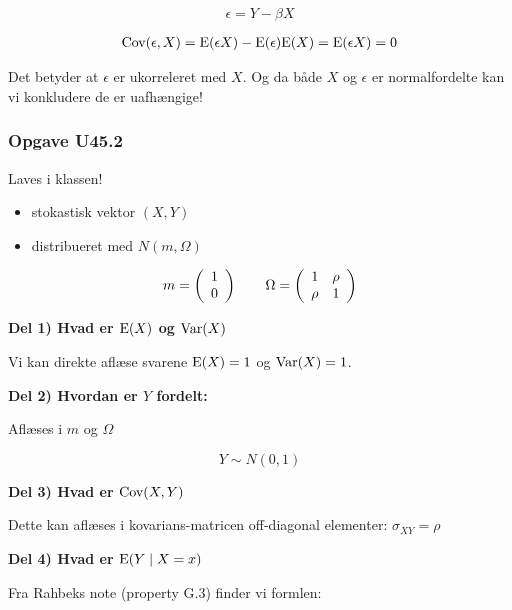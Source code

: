 \begin{equation}
    \epsilon = Y - \beta X
\end{equation}

\begin{align}
    \text{Cov}(\epsilon, X) = \text{E}(\epsilon X ) - \text{E}(\epsilon) \text{E}(X) = \text{E}(\epsilon X ) = 0
\end{align}

Det betyder at $\epsilon$ er ukorreleret med $X$. Og da både $X$ og $\epsilon$ er normalfordelte kan vi konkludere de er uafhængige!

\subsubsection{Opgave U45.2}

Laves i klassen!

\begin{itemize}
    \item stokastisk vektor $(X,Y)$
    \item distribueret med $N(m, \Omega)$
\end{itemize}

\begin{equation}
    m = \left( 
    \begin{array}{cc}
         1  \\
         0 
    \end{array} \right)
    \qquad \Omega = \left(
    \begin{array}{cc}
         1 & \rho  \\
         \rho & 1
    \end{array} \right)
\end{equation}

\textbf{Del 1) Hvad er $\text{E}(X)$ og $\text{Var}(X)$}

Vi kan direkte aflæse svarene $\text{E}(X) = 1$ og $\text{Var}(X) = 1$.

\textbf{Del 2) Hvordan er $Y$ fordelt:}

Aflæses i $m$ og $\Omega$   

\begin{equation}
    Y \sim N(0,1)
\end{equation}

\textbf{Del 3) Hvad er $\text{Cov}(X,Y)$}

Dette kan aflæses i kovarians-matricen off-diagonal elementer: $\sigma_{X Y} =  \rho$

\textbf{Del 4) Hvad er $\text{E}(Y \mid X = x)$}

Fra Rahbeks note (property G.3) finder vi formlen:

